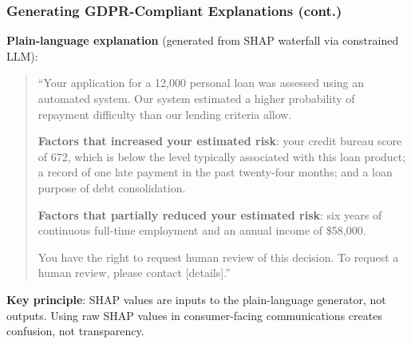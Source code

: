 \documentclass[9pt,t]{beamer}
\begin{document}
\begin{frame}
\frametitle{Generating GDPR-Compliant Explanations (cont.)}

\textbf{Plain-language explanation} (generated from SHAP waterfall via constrained LLM):

\begin{quote}
\small
``Your application for a \texteuro{}12,000 personal loan was assessed using an automated system.
Our system estimated a higher probability of repayment difficulty than our lending criteria allow.

\textbf{Factors that increased your estimated risk}: your credit bureau score of 672, which is below
the level typically associated with this loan product; a record of one late payment in the past
twenty-four months; and a loan purpose of debt consolidation.

\textbf{Factors that partially reduced your estimated risk}: six years of continuous full-time
employment and an annual income of \$58,000.

You have the right to request human review of this decision. To request a human review,
please contact [details].''
\end{quote}

\textbf{Key principle}: SHAP values are inputs to the plain-language generator, not outputs.
Using raw SHAP values in consumer-facing communications creates confusion, not transparency.
\end{frame}
\end{document}
